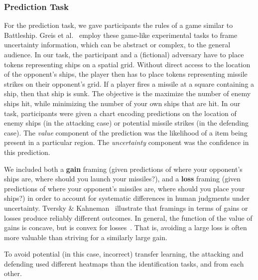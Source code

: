 \documentclass{vgtc}                          %
\begin{document}
\subsubsection{Prediction Task}

For the prediction task, we gave participants the rules of a game similar to Battleship. Greis et al.~\cite{greis2016decision} employ these game-like experimental tasks to frame uncertainty information, which can be abstract or complex, to the general audience. In our task, the participant and a (fictional) adversary have to place tokens representing ships on a spatial grid. Without direct access to the location of the opponent's ships, the player then has to place tokens representing missile strikes on their opponent's grid. If a player fires a missile at a square containing a ship, then that ship is sunk. The objective is the maximize the number of enemy ships hit, while minimizing the number of your own ships that are hit. In our task, participants were given a chart encoding predictions on the location of enemy ships (in the attacking case) or potential missile strikes (in the defending case). The \emph{value} component of the prediction was the likelihood of a item being present in a particular region. The \emph{uncertainty} component was the confidence in this prediction.

We included both a \textbf{gain} framing (given predictions of where your opponent's ships are, where should you launch your missiles?), and a \textbf{loss} framing (given predictions of where your opponent's missiles are, where should you place your ships?) in order to account for systematic differences in human judgments under uncertainty. Tversky \& Kahneman~\cite{tversky1985framing} illustrate that framings in terms of gains or losses produce reliably different outcomes. In general, the function of the value of gains is concave, but is convex for losses~\cite{kahneman1979prospect}. That is, avoiding a large loss is often more valuable than striving for a similarly large gain.

To avoid potential (in this case, incorrect) transfer learning, the attacking and defending used different heatmaps than the identification tasks, and from each other. 

\end{document}
